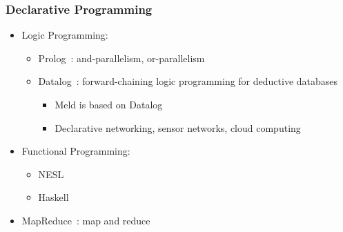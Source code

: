 \documentclass{beamer}
\begin{document}
\frame
{
   \frametitle{Declarative Programming}
   \begin{itemize}
      \item Logic Programming:
      \begin{itemize}
         \item Prolog~\cite{Colmerauer:1993:BP:154766.155362}: and-parallelism, or-parallelism~\cite{Gupta:2001:PEP:504083.504085}
         \item Datalog~\cite{zaniolo-arni-ong-dood93}: forward-chaining logic programming for deductive databases
         \begin{itemize}
            \item Meld is based on Datalog
            \item Declarative networking, sensor networks, cloud computing
         \end{itemize}
      \end{itemize}
      \item Functional Programming:
      \begin{itemize}
         \item NESL
         \item Haskell
      \end{itemize}
      \item MapReduce~\cite{Dean:2008:MSD:1327452.1327492}: map and reduce
   \end{itemize}
}
\end{document}
